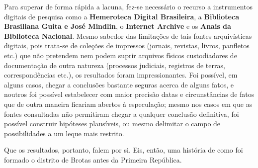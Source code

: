 Para superar de forma rápida a lacuna, fez-se necessário o recurso a instrumentos digitais de pesquisa como a \textbf{Hemeroteca Digital Brasileira}, a \textbf{Biblioteca Brasiliana Guita e José Mindlin}, o \textbf{Internet Archive} e os \textbf{Anais da Biblioteca Nacional}. Mesmo sabedor das limitações de tais fontes arquivísticas digitais, pois trata-se de coleções de impressos (jornais, revistas, livros, panfletos etc.) que não pretendem nem podem suprir arquivos físicos custodiadores de documentação de outra natureza (processos judiciais, registros de terras, correspondências etc.), os resultados foram impressionantes. Foi possível, em alguns casos, chegar a conclusões bastante seguras acerca de alguns fatos, e noutros foi possível estabelecer com maior precisão datas e circunstâncias de fatos que de outra maneira ficariam abertos à especulação; mesmo nos casos em que as fontes consultadas não permitiram chegar a qualquer conclusão definitiva, foi possível construir hipóteses plausíveis, ou mesmo delimitar o campo de possibilidades a um leque mais restrito.

Que os resultados, portanto, falem por si. Eis, então, uma história de como foi formado o distrito de Brotas antes da Primeira República.






%
